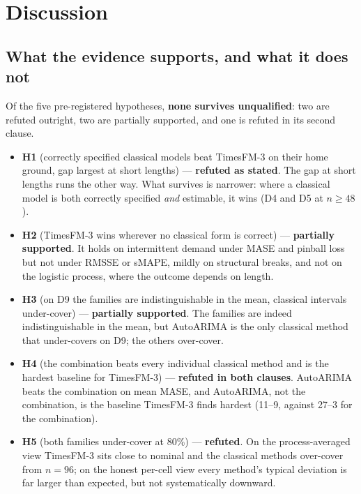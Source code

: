 \documentclass[article]{ajs}
\begin{document}
\section{Discussion}

\subsection{What the evidence supports, and what it does not}

Of the five pre-registered hypotheses, \textbf{none survives unqualified}: two are refuted
outright, two are partially supported, and one is refuted in its second clause.

\begin{itemize}
\item \textbf{H1} (correctly specified classical models beat TimesFM-3 on their home ground,
      gap largest at short lengths) --- \textbf{refuted as stated}. The gap at short lengths runs
      the other way. What survives is narrower: where a classical model is both correctly
      specified \emph{and} estimable, it wins (D4 and D5 at $n \geq 48$).
\item \textbf{H2} (TimesFM-3 wins wherever no classical form is correct) ---
      \textbf{partially supported}. It holds on intermittent demand under MASE and pinball loss
      but not under RMSSE or sMAPE, mildly on structural breaks, and not on the logistic process,
      where the outcome depends on length.
\item \textbf{H3} (on D9 the families are indistinguishable in the mean, classical intervals
      under-cover) --- \textbf{partially supported}. The families are indeed indistinguishable in
      the mean, but AutoARIMA is the only classical method that under-covers on D9; the others
      over-cover.
\item \textbf{H4} (the combination beats every individual classical method and is the hardest
      baseline for TimesFM-3) --- \textbf{refuted in both clauses}. AutoARIMA beats the
      combination on mean MASE, and AutoARIMA, not the combination, is the baseline TimesFM-3
      finds hardest (11--9, against 27--3 for the combination).
\item \textbf{H5} (both families under-cover at 80\%) --- \textbf{refuted}. On the
      process-averaged view TimesFM-3 sits close to nominal and the classical methods over-cover
      from $n = 96$; on the honest per-cell view every method's typical deviation is far larger
      than expected, but not systematically downward.
\end{itemize}
\end{document}
